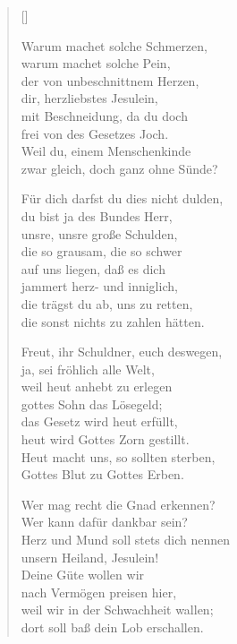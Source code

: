\begin{multicols}{2}
\settowidth{\versewidth}{Für dich darfst du dies nicht dulden,}
\begin{verse}[\versewidth]
 
 Warum machet solche Schmerzen,\\
warum machet solche Pein,\\
der von unbeschnittnem Herzen,\\
dir, herzliebstes Jesulein,\\
mit Beschneidung, da du doch\\
frei von des Gesetzes Joch.\\
Weil du, einem Menschenkinde\\
zwar gleich, doch ganz ohne Sünde?
 
 Für dich darfst du dies nicht dulden,\\
du bist ja des Bundes Herr,\\
unsre, unsre große Schulden,\\
die so grausam, die so schwer\\
auf uns liegen, daß es dich\\
jammert herz- und inniglich,\\
die trägst du ab, uns zu retten,\\
die sonst nichts zu zahlen hätten.
 
 Freut, ihr Schuldner, euch deswegen,\\
ja, sei fröhlich alle Welt,\\
weil heut anhebt zu erlegen\\
gottes Sohn das Lösegeld;\\
das Gesetz wird heut erfüllt,\\
heut wird Gottes Zorn gestillt.\\
Heut macht uns, so sollten sterben,\\
Gottes Blut zu Gottes Erben.
 
 Wer mag recht die Gnad erkennen?\\
Wer kann dafür dankbar sein?\\
Herz und Mund soll stets dich nennen\\
unsern Heiland, Jesulein!\\
Deine Güte wollen wir\\
nach Vermögen preisen hier,\\
weil wir in der Schwachheit wallen;\\
dort soll baß dein Lob erschallen.

\end{verse}
\end{multicols}
